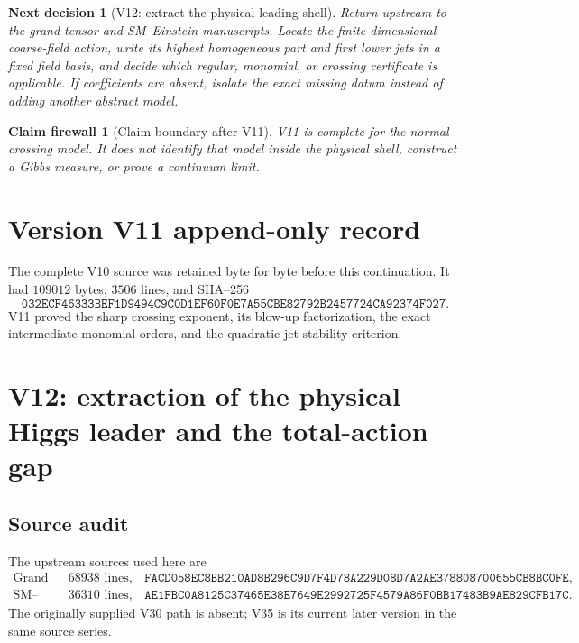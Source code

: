 \documentclass[11pt]{article}
\newtheorem{firewall}[theorem]{Claim firewall}
\newtheorem{decision}[theorem]{Next decision}
\theoremstyle{remark}
\begin{document}
\begin{decision}[V12: extract the physical leading shell]
\label{dec:v17v11-next}
Return upstream to the grand-tensor and SM--Einstein manuscripts.
Locate the finite-dimensional coarse-field action, write its
highest homogeneous part and first lower jets in a fixed field
basis, and decide which regular, monomial, or crossing certificate
is applicable.  If coefficients are absent, isolate the exact
missing datum instead of adding another abstract model.
\end{decision}

\begin{firewall}[Claim boundary after V11]
\label{fire:v17v11}
V11 is complete for the normal-crossing model.  It does not identify
that model inside the physical shell, construct a Gibbs measure, or
prove a continuum limit.
\end{firewall}

\section*{Version V11 append-only record}
The complete V10 source was retained byte for byte before this
continuation.  It had \(109012\) bytes, \(3506\) lines, and SHA--256
\[
 \texttt{032ECF46333BEF1D9494C9C0D1EF60F0E7A55CBE82792B2457724CA92374F027}.
\]
V11 proved the sharp crossing exponent, its blow-up factorization,
the exact intermediate monomial orders, and the quadratic-jet
stability criterion.


\section{V12: extraction of the physical Higgs leader and the total-action gap}
\label{sec:v17v12}

\subsection{Source audit}

The upstream sources used here are
\[
\begin{array}{lll}
\text{Grand Tensor V067:}&68938\text{ lines},&
\texttt{FACD058EC8BB210AD8B296C9D7F4D78A229D08D7A2AE378808700655CB8BC0FE},\\
\text{SM--Einstein V35:}&36310\text{ lines},&
\texttt{AE1FBC0A8125C37465E38E7649E2992725F4579A86F0BB17483B9AE829CFB17C}.
\end{array}                                                       \tag{12.1}
\]
The originally supplied V30 path is absent; V35 is its current later
version in the same source series.
\end{document}
